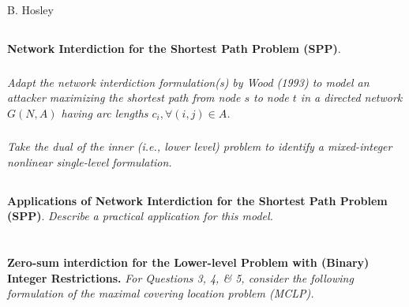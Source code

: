 \documentclass[12pt]{amsart}
\begin{document}
\raggedbottom

\hspace{\fill} {\large B. Hosley}
\bigskip


\setcounter{subsection}{0}
\subsection{}
\textbf{Network Interdiction for the Shortest Path Problem (SPP)}.

\subsubsection{}
\textit{Adapt the network interdiction formulation(s) by Wood (1993) to model an attacker
	maximizing the shortest path from node $s$ to node $t$ in a directed network $G(N, A)$
	having arc lengths $c_i, ∀ (i, j) \in A$.}


\subsubsection{}
\textit{Take the dual of the inner (i.e., lower level) problem to identify a mixed-integer
	nonlinear single-level formulation.}



\subsection{}
\textbf{Applications of Network Interdiction for the Shortest Path Problem (SPP)}.
\textit{Describe a practical application for this model.}



\section{}
\setcounter{subsection}{2}

\textbf{Zero-sum interdiction for the Lower-level Problem with (Binary) Integer Restrictions.} 
\textit{For Questions 3, 4, \& 5, consider the following formulation of the maximal covering 
location problem (MCLP).} \\
\end{document}
